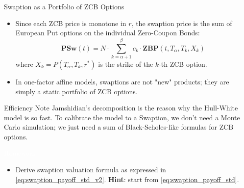 \documentclass{beamer}
\begin{document}
	\begin{frame}{Swaption as a Portfolio of ZCB Options }
		\begin{itemize}
			\item Since each ZCB price is monotone in $r$, the swaption price is the sum of European Put options on the individual Zero-Coupon Bonds:
			\begin{equation}
				\boxed{\textbf{PSw}(t) = N\cdot\sum_{k=\alpha+1}^\beta c_k\cdot \textbf{ZBP}(t, T_\alpha, T_k, X_k)}
			\end{equation}
			where $X_k = P(T_\alpha, T_k, r^*)$ is the strike of the $k$-th ZCB option.
			\item In one-factor affine models, swaptions are not "new" products; they are simply a \textcolor{maincolor}{static portfolio of ZCB options}.
		\end{itemize}
		\vfill
		\begin{block}{Efficiency Note}
			Jamshidian's decomposition is the reason why the Hull-White model is so fast. To calibrate the model to a Swaption, we don't need a Monte Carlo simulation; we just need a sum of Black-Scholes-like formulas for ZCB options.
		\end{block}
	\end{frame}

	\begin{homework}
		\begin{frame}{\textcolor{white}{Homework}}
			\begin{itemize}
				\item[white] Derive swaption valuation formula as expressed in \cref{eq:swaption_payoff_std_v2}. \textbf{Hint}: start from \cref{eq:swaption_payoff_std}.
			\end{itemize}
		\end{frame}
	\end{homework}
\end{document}
